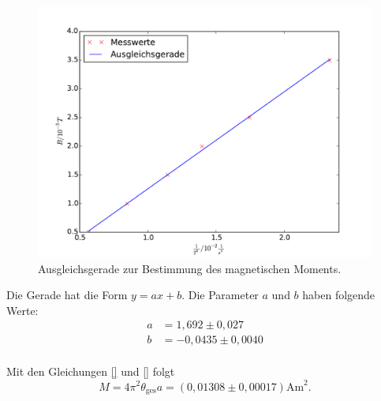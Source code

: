     \begin{figure}
      \centering
      \includegraphics[width=\textwidth]{auswertung/magn-moment.pdf}
    \caption{Ausgleichsgerade zur Bestimmung des magnetischen Moments.}
      \label{fig:eckig}
    \end{figure}

    Die Gerade hat die Form $y=ax+b$. Die Parameter $a$ und $b$ haben folgende Werte:
    \begin{align}
      a&=1,692 \pm 0,027 \\
      b&= -0,0435 \pm 0,0040 \\
    \end{align}

    Mit den Gleichungen \ref{} und \ref{} folgt
    \begin{equation}
      M = 4\pi^2 \theta_\mathrm{ges} a = (0,01308 \pm 0,00017) \si{\ampere \meter}^2.
    \end{equation}
